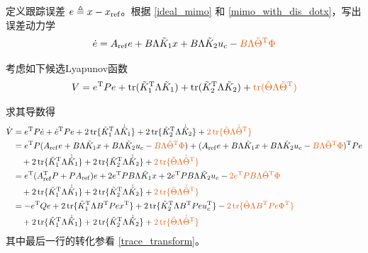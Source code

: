 定义跟踪误差 $e \triangleq x - x_{\operatorname{ref}}$。根据 \eqref{ideal_mimo} 和 \eqref{mimo_with_dis_dotx}，写出误差动力学
\begin{equation}
  \dot{e} = A_{\refval} e + B \Lambda  \tilde{K}_1 x +
  B \Lambda  \tilde{K}_2 u_c-\textcolor{second}{B\Lambda \tilde{\Theta}^\mathrm{T}\Phi} \label{errsys_with_dis:MRAC:GLS}
\end{equation}

考虑如下候选Lyapunov函数
\begin{equation}
  V=e^\mathrm{T}Pe+\tr(\tilde{K}_1^\mathrm{T}{\Lambda}\tilde{K}_1)+\tr(\tilde{K}_2^\mathrm{T}{\Lambda}\tilde{K}_2)+\textcolor{second}{\tr (\tilde{\Theta}{\Lambda}\tilde{\Theta}^\mathrm{T})}
\end{equation}

求其导数得
\begin{align}
  \dot{V} & =e^\mathrm{T}P\dot{e}+\dot{e}^\mathrm{T}Pe + 2\tr \{
  \tilde{K}^\mathrm{T}_1 \Lambda\dot{\hat{K}} _1 \} + 2\tr
  \{ \tilde{K}^\mathrm{T}_2 \Lambda\dot{\hat{K}} _2 \}+\textcolor{second}{2\tr \{ \tilde{\Theta} \Lambda\dot{\hat{\Theta}}^\mathrm{T} \}}\nonumber\\
  & = e^\mathrm{T}P( A_{\refval} e + B \Lambda  \tilde{K}_1 x +
  B \Lambda  \tilde{K}_2 u_c-\textcolor{second}{B\Lambda \tilde{\Theta}^\mathrm{T}\Phi})+(A_{\refval} e + B \Lambda  \tilde{K}_1 x +
  B \Lambda  \tilde{K}_2 u_c-\textcolor{second}{B\Lambda \tilde{\Theta}^\mathrm{T}\Phi})^\mathrm{T}Pe\nonumber\\
  &\quad+
  2\tr \{ \tilde{K}^\mathrm{T}_1 \Lambda\dot{\hat{K}} _1 \}
  + 2\tr \{ \tilde{K}^\mathrm{T}_2 \Lambda\dot{\hat{K}} _2 \}+\textcolor{second}{2\tr \{ \tilde{\Theta} \Lambda\dot{\hat{\Theta}}^\mathrm{T} \}}\nonumber\\
  &= e^\mathrm{T}(A_{\refval}^\mathrm{T} P + P A_{\refval}) e+ 2 e^\mathrm{T}  P  B \Lambda 
  \tilde{K}_1 x + 2 e^\mathrm{T} P  B \Lambda  \tilde{K}_2 u_c -\textcolor{second}{2 e^\mathrm{T}PB\Lambda \tilde{\Theta}^\mathrm{T}\Phi}\nonumber\\
  &\quad +  2\tr \{ \tilde{K}^\mathrm{T}_1  \Lambda\dot{\hat{K}} _1 \}
  + 2\tr \{ \tilde{K}^\mathrm{T}_2  \Lambda\dot{\hat{K}} _2
  \}+\textcolor{second}{2\tr \{ \tilde{\Theta} \Lambda\dot{\hat{\Theta}}^\mathrm{T} \}}\nonumber\\
  & = -e^\mathrm{T}Q e +
  2\tr \{ \tilde{K}^\mathrm{T}_1 \Lambda B^\mathrm{T}  P  e  x^\mathrm{T} \} +
  2\tr \{ \tilde{K}^\mathrm{T}_2 \Lambda B^\mathrm{T}  P  e  u_c^\mathrm{T} \} - \textcolor{second}{2\tr \{ \tilde{\Theta} \Lambda B^\mathrm{T}Pe\Phi^\mathrm{T}
  \}}\nonumber\\
  &\quad + 2\tr \{ \tilde{K}^\mathrm{T}_1  \Lambda\dot{\hat{K}} _1 \}
  + 2\tr \{ \tilde{K}^\mathrm{T}_2  \Lambda \dot{\hat{K}} _2\}+\textcolor{second}{2\tr \{ \tilde{\Theta} \Lambda\dot{\hat{\Theta}}^\mathrm{T} \}}\label{pro_dot_V_modify}
\end{align}
其中最后一行的转化参看 \eqref{trace_transform}。

